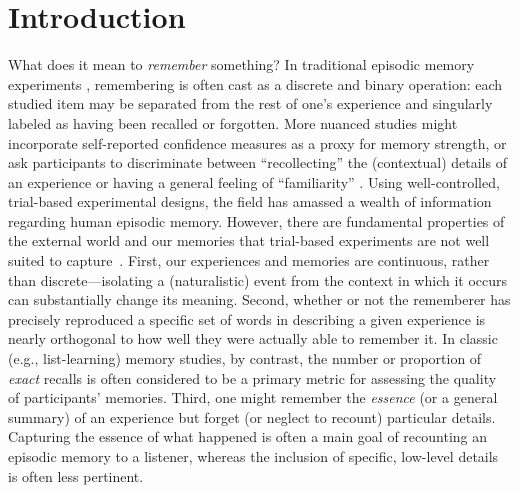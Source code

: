 \documentclass{article}
\begin{document}
\section*{Introduction}
What does it mean to \textit{remember} something? In traditional episodic memory experiments \citep[e.g., list-learning or trial-based experiments;][]{Murd62a, Kaha96}, remembering is often cast as a discrete and binary operation: each studied item may be separated from the rest of one's experience and singularly labeled as having been recalled or forgotten. More nuanced studies might incorporate self-reported confidence measures as a proxy for memory strength, or ask participants to discriminate between ``recollecting'' the (contextual) details of an experience or having a general feeling of ``familiarity'' \citep{Yone02}. Using well-controlled, trial-based experimental designs, the field has amassed a wealth of information regarding human episodic memory.  However, there are fundamental properties of the external world and our memories that trial-based experiments are not well suited to capture~\citep[for review, also see][]{KoriGold94, HukEtal18}.  First, our experiences and memories are continuous, rather than discrete---isolating a (naturalistic) event from the context in which it occurs can substantially change its meaning.  Second, whether or not the rememberer has precisely reproduced a specific set of words in describing a given experience is nearly orthogonal to how well they were actually able to remember it.  In classic (e.g., list-learning) memory studies, by contrast, the number or proportion of \textit{exact} recalls is often considered to be a primary metric for assessing the quality of participants' memories.  Third, one might remember the \textit{essence} (or a general summary) of an experience but forget (or neglect to recount) particular details.  Capturing the essence of what happened is often a main goal of recounting an episodic memory to a listener, whereas the inclusion of specific, low-level details is often less pertinent.
\end{document}
